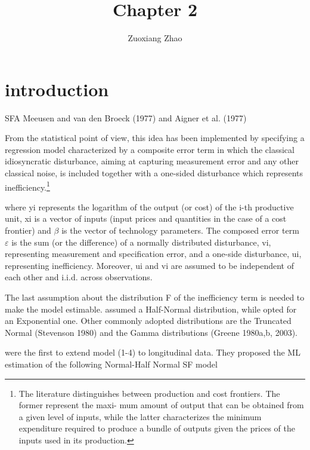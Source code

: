 \documentclass[12pt]{article}
\begin{document}
\title{Chapter 2}

\author{Zuoxiang Zhao}

\date{}
\maketitle

\section{introduction}
SFA Meeusen and van den Broeck (1977) and Aigner et al. (1977)


From the statistical point of view, this idea has been implemented by specifying
a regression model characterized by a composite error term in which the classical idiosyncratic disturbance, aiming at capturing measurement error and any other classical
noise, is included together with a one-sided disturbance which represents inefficiency.\footnote{The literature distinguishes between production and cost frontiers. The former represent the maxi-
mum amount of output that can be obtained from a given level of inputs, while the latter characterizes
the minimum expenditure required to produce a bundle of outputs given the prices of the inputs used
in its production.}

where yi represents the logarithm of the output (or cost) of the i-th productive unit,
xi is a vector of inputs (input prices and quantities in the case of a cost frontier) and
$\beta$ is the vector of technology parameters. The composed error term $\varepsilon$ is the sum (or
the difference) of a normally distributed disturbance, vi, representing measurement and
specification error, and a one-side disturbance, ui, representing inefficiency. Moreover,
ui and vi are assumed to be independent of each other and i.i.d. across observations.

The last assumption about the distribution F of the inefficiency term is needed to make
the model estimable. \citet{aigner1977formulation} assumed a Half-Normal distribution,
 while \citet{meeusen1977efficiency} opted for an Exponential
one. Other commonly adopted distributions are the Truncated Normal \citep{stevenson1980likelihood}
(Stevenson 1980) and the Gamma distributions \citep{greene1980maximum} (Greene 1980a,b, 2003).

\citet{pitt1981measurement} were the first to extend model (1-4) to longitudinal data. They
proposed the ML estimation of the following Normal-Half Normal SF model
\end{document}
